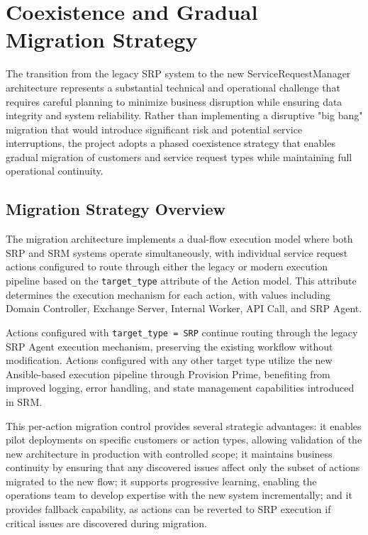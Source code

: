 \chapter{Coexistence and Gradual Migration Strategy}

The transition from the legacy SRP system to the new ServiceRequestManager architecture represents a substantial technical and operational challenge that requires careful planning to minimize business disruption while ensuring data integrity and system reliability. Rather than implementing a disruptive "big bang" migration that would introduce significant risk and potential service interruptions, the project adopts a phased coexistence strategy that enables gradual migration of customers and service request types while maintaining full operational continuity.

\section{Migration Strategy Overview}

The migration architecture implements a dual-flow execution model where both SRP and SRM systems operate simultaneously, with individual service request actions configured to route through either the legacy or modern execution pipeline based on the \texttt{target\_type} attribute of the Action model. This attribute determines the execution mechanism for each action, with values including Domain Controller, Exchange Server, Internal Worker, API Call, and SRP Agent.

Actions configured with \texttt{target\_type = SRP} continue routing through the legacy SRP Agent execution mechanism, preserving the existing workflow without modification. Actions configured with any other target type utilize the new Ansible-based execution pipeline through Provision Prime, benefiting from improved logging, error handling, and state management capabilities introduced in SRM.

This per-action migration control provides several strategic advantages: it enables pilot deployments on specific customers or action types, allowing validation of the new architecture in production with controlled scope; it maintains business continuity by ensuring that any discovered issues affect only the subset of actions migrated to the new flow; it supports progressive learning, enabling the operations team to develop expertise with the new system incrementally; and it provides fallback capability, as actions can be reverted to SRP execution if critical issues are discovered during migration.

